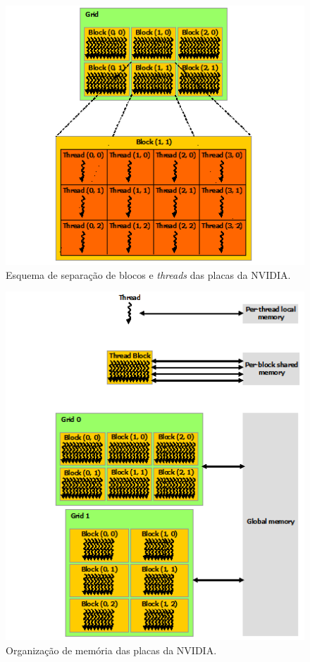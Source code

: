 \begin{figure}[t]
\centering\includegraphics{monografia/cuda_grid}
\caption{Esquema de separação de blocos e \emph{threads} das placas da NVIDIA.}
\label{cuda_grid}
\end{figure}

\begin{figure}[t]
\centering\includegraphics{monografia/cuda_memory}
\caption{Organização de memória das placas da NVIDIA.}
\label{cuda_memory}
\end{figure}

